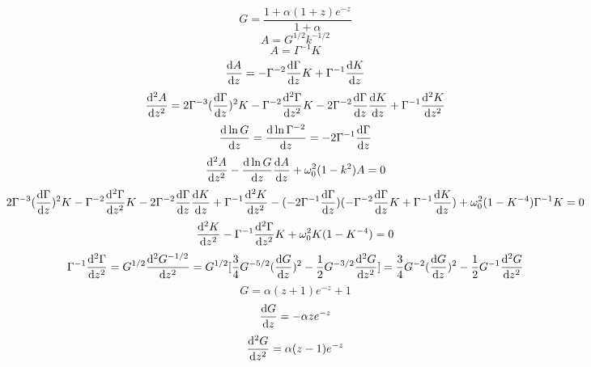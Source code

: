 \begin{equation}
    G=\frac{1+\alpha(1+z)e^{-z}}{1+\alpha}
\end{equation}
\begin{equation}
    A=G^{1/2}k^{-1/2}
\end{equation}
\begin{equation}
    A=\Gamma^{-1}K
\end{equation}
\begin{equation}
    \frac{\mathrm{d} A}{\mathrm{d} z}=-\Gamma^{-2}\frac{\mathrm{d} \Gamma}{\mathrm{d} z}K+\Gamma^{-1}\frac{\mathrm{d} K}{\mathrm{d} z}
\end{equation}
\begin{equation}
    \frac{\mathrm{d}^2 A}{\mathrm{d} z^2}=2\Gamma^{-3}(\frac{\mathrm{d} \Gamma}{\mathrm{d} z})^2K-\Gamma^{-2}\frac{\mathrm{d}^2\Gamma}{\mathrm{d} z^2}K-2\Gamma^{-2}\frac{\mathrm{d} \Gamma}{\mathrm{d} z}\frac{\mathrm{d} K}{\mathrm{d} z}+\Gamma^{-1}\frac{\mathrm{d}^2 K}{\mathrm{d} z^2}
\end{equation}
\begin{equation}
    \frac{\mathrm{d} \ln G}{\mathrm{d} z}=\frac{\mathrm{d} \ln \Gamma^{-2}}{\mathrm{d} z}=-2\Gamma^{-1}\frac{\mathrm{d} \Gamma}{\mathrm{d} z}
\end{equation}
\begin{equation}
    \frac{\mathrm{d}^2 A}{\mathrm{d} z^2}-\frac{\mathrm{d} \ln G}{\mathrm{d} z}\frac{\mathrm{d} A}{\mathrm{d} z}+\omega_0^2(1-k^2)A=0
\end{equation}
\begin{equation}
    2\Gamma^{-3}(\frac{\mathrm{d} \Gamma}{\mathrm{d} z})^2K-\Gamma^{-2}\frac{\mathrm{d}^2\Gamma}{\mathrm{d} z^2}K-2\Gamma^{-2}\frac{\mathrm{d} \Gamma}{\mathrm{d} z}\frac{\mathrm{d} K}{\mathrm{d} z}+\Gamma^{-1}\frac{\mathrm{d}^2 K}{\mathrm{d} z^2}-(-2\Gamma^{-1}\frac{\mathrm{d} \Gamma}{\mathrm{d} z})(-\Gamma^{-2}\frac{\mathrm{d} \Gamma}{\mathrm{d} z}K+\Gamma^{-1}\frac{\mathrm{d} K}{\mathrm{d} z})+\omega_0^2(1-K^{-4})\Gamma^{-1}K=0
\end{equation}
\begin{equation}
    \frac{\mathrm{d}^2 K}{\mathrm{d} z^2}-\Gamma^{-1}\frac{\mathrm{d}^2\Gamma}{\mathrm{d} z^2}K+\omega_0^2K(1-K^{-4})=0
\end{equation}
\begin{equation}
    \Gamma^{-1}\frac{\mathrm{d}^2\Gamma}{\mathrm{d} z^2}=G^{1/2}\frac{\mathrm{d}^2 G^{-1/2}}{\mathrm{d} z^2}=G^{1/2}[\frac{3}{4}G^{-5/2}(\frac{\mathrm{d} G}{\mathrm{d} z})^2-\frac{1}{2}G^{-3/2}\frac{\mathrm{d}^2 G}{\mathrm{d} z^2}]=\frac{3}{4}G^{-2}(\frac{\mathrm{d} G}{\mathrm{d} z})^2-\frac{1}{2}G^{-1}\frac{\mathrm{d}^2 G}{\mathrm{d} z^2}
\end{equation}
\begin{equation}
    G=\alpha(z+1)e^{-z}+1
\end{equation}
\begin{equation}
    \frac{\mathrm{d} G}{\mathrm{d} z}=-\alpha ze^{-z}
\end{equation}
\begin{equation}
    \frac{\mathrm{d}^2 G}{\mathrm{d} z^2}=\alpha(z-1)e^{-z}
\end{equation}
